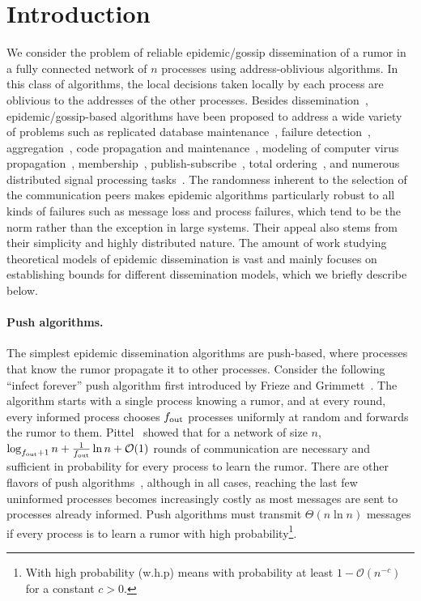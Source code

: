 \section{Introduction}
\label{sec:introduction}

We consider the problem of reliable epidemic/gossip dissemination of a rumor in a fully connected network of $n$ processes using address-oblivious algorithms. In this class of algorithms, the local decisions taken locally by each process are oblivious to the addresses of the other processes. Besides dissemination~\cite{bimodal}, epidemic/gossip-based algorithms have been proposed to address a wide variety of problems such as replicated database maintenance~\cite{Demers:1987:EAR:41840.41841}, failure detection~\cite{vanRenesse:1998:GFD:1659232.1659238},
aggregation~\cite{Kempe:2003:GCA:946243.946317}, code propagation and maintenance~\cite{Levis:2004:TSA:1251175.1251177}, modeling of computer virus propagation~\cite{Berger:2005:SVI:1070432.1070475}, membership~\cite{Jelasity2007},  publish-subscribe~\cite{10.1109/TPDS.2013.6}, total ordering~\cite{matos2015epto}, and numerous distributed signal processing tasks~\cite{journals/pieee/DimakisKMRS10}. The randomness inherent to the selection of the communication peers makes epidemic algorithms particularly robust to all kinds of failures such as message loss and process failures, which tend to be the norm rather than the exception in large systems. Their appeal also stems from their simplicity and highly distributed nature. 
The amount of work studying theoretical models of epidemic dissemination is vast and mainly focuses on establishing bounds for different dissemination models, which we briefly describe below.

\paragraph{\textbf{Push algorithms.}}

The simplest epidemic dissemination algorithms are push-based, where processes that know the rumor propagate
it to other processes.  Consider the following ``infect forever'' push algorithm first introduced by Frieze and Grimmett~\cite{DBLP:journals/dam/FriezeG85}. The algorithm starts with a
single process knowing a rumor, and at every round, every informed process chooses $f_\text{out}$ processes uniformly at random and forwards the rumor to them. Pittel~\cite{Pittel:1987:SR:37387.37400} showed that for a network of size $n$,
$\log_{f_\text{out}+1}n+\frac{1}{f_\text{out}}\ln n + \mathcal{O}(1)$ rounds of communication are necessary and
sufficient in probability for every process to learn the rumor.
There are other flavors of push algorithms~\cite{EGMM2004,koldehofe2004simple}, although in all cases,
reaching the last few uninformed processes becomes increasingly costly as most messages are sent to processes already
informed.  Push algorithms must transmit $\Theta(n \ln n)$ messages if every process is to learn a rumor with high probability\footnote{With high probability (w.h.p)
  means with probability at least $1-\mathcal{O}\left(n^{-c}\right)$ for a constant $c>0$.}.

